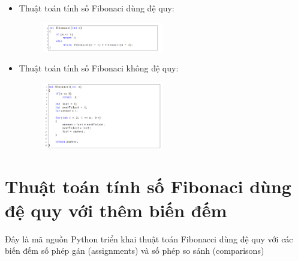 \documentclass[12pt,a4paper]{article}
\begin{document}
\begin{enumerate}[label=\textbf{Câu 2:} ]
\begin{enumerate}[label=\textbf{Câu 3:} ]
\begin{enumerate}[label=\alph*)]
                              \begin{itemize}[label=$\bullet$]
                                  \item Thuật toán tính số Fibonaci dùng đệ quy:
                                        \begin{figure}[h] %
                                            \centering
                                            \includegraphics[width=0.5\textwidth]{image/img3.png} %
                                            \label{fig:hinh_anh}
                                        \end{figure}
                                    
                                    
                                  \item Thuật toán tính số Fibonaci không đệ quy:
                                        \begin{figure}[h] %
                                            \centering
                                            \includegraphics[width=0.5\textwidth]{image/img4.png} %
                                            \label{fig:hinh_anh}
                                        \end{figure}
                              \end{itemize}
                              \section*{Thuật toán tính số Fibonaci dùng đệ quy với thêm biến đếm}
                                    Đây là mã nguồn Python triển khai thuật toán Fibonacci dùng đệ quy với các biến đếm số phép gán (assignments) và số phép so sánh (comparisons)\\
                        

\end{enumerate}
\end{enumerate}
\end{enumerate}
\end{document}
